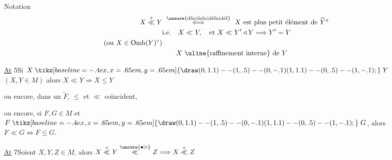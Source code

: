 Notation
\[
\begin{aligned}
X\overset{\circ}{\ll}Y&\ \overset{\text{\unsure{dfn|defn|défn|déf}}}{\Longleftrightarrow}\ X\text{ est plus petit élément de }\widetilde Y^{x}\\
&\text{i.e.}\quad X\ll Y,\quad\text{et } X\ll Y'\triangleleft Y\Longrightarrow Y'=Y\\
(\text{ou } X\in\mathrm{Omb}(Y)^{\circ}) &\\
&\qquad X\ \text{\uline{raffinement interne} de }Y
\end{aligned}
\]

\uline{At} 5\quad Si $X\mathrel{\tikz[baseline=-.4ex,x=.65em,y=.65em]{\draw (0,1.1)--(1,.5)--(0,-.1) (1,1.1)--(0,.5)--(1,-.1);}}Y$ $(X,Y\in M)$ alors $X\ll Y\Longrightarrow X\leq Y$

ou encore, dans un $\widetilde F$, $\leq$ et $\ll$ coïncident,

ou encore, si $F,G\in M$ et $F\mathrel{\tikz[baseline=-.4ex,x=.65em,y=.65em]{\draw (0,1.1)--(1,.5)--(0,-.1) (1,1.1)--(0,.5)--(1,-.1);}}G$, alors $F\ll G\Longleftrightarrow F\leq G$.

\uline{At} 7\quad Soient $X,Y,Z\in M$, alors $X\overset{\circ}{\ll}Y\overset{\unsure{\bullet|\circ}}{\ll}Z\Longrightarrow X\overset{\circ}{\ll}Z$

